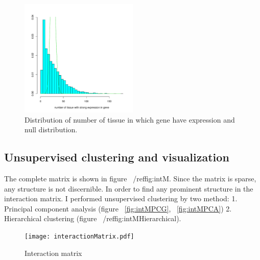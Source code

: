 \documentclass{article}
\begin{document}
\begin{figure}[ht]
	\begin{center}
		\includegraphics[width=0.5\textwidth]{weakExpressed.pdf}
	\end{center}
	\caption{ Distribution of number of tissue in which gene have expression and null distribution.}
	\label{fig:weakEx}
\end{figure}


\subsection{Unsupervised clustering and visualization}

The complete matrix is shown in 
figure ~/ref{fig:intM}. Since the matrix is sparse, any structure is not discernible. 
In order to find any prominent structure in the interaction matrix. I performed unsupervised clustering by two method: 1. Principal component
analysis (figure ~\ref{fig:intMPCG}, ~\ref{fig:intMPCA}) 2. Hierarchical clustering (figure ~/ref{fig:intMHierarchical}).

\begin{figure}[ht]
	\begin{center}
		\texttt{[image: interactionMatrix.pdf]}
	\end{center}
	\caption{Interaction matrix}
	\label{fig:intM}
\end{figure}
\end{document}
